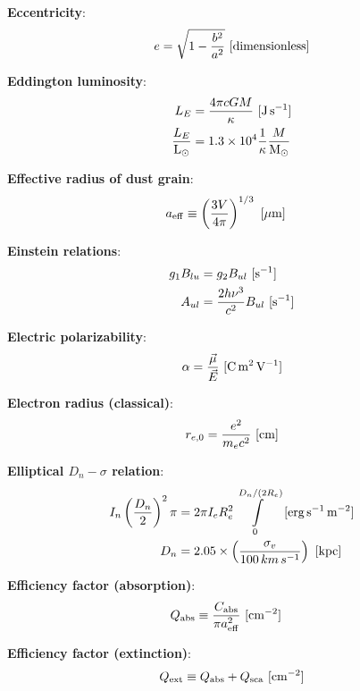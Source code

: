 \documentclass[a4paper,10pt]{article}
\begin{document}
{\noindent}\textbf{Eccentricity}:
\begin{align*}
    e = \sqrt{1-\frac{b^2}{a^2}} ~ [{\rm dimensionless}]
\end{align*}

{\noindent}\textbf{Eddington luminosity}:
\begin{align*}
    L_E &= \frac{4\pi cGM}{\kappa} ~ [{\rm J\,s^{-1}}] \\
    \frac{L_E}{{\rm L_\odot}} &= 1.3\times10^4\frac{1}{\kappa} \frac{M}{{\rm M_\odot}}
\end{align*}

{\noindent}\textbf{Effective radius of dust grain}:
\begin{align*}
    a_{\rm eff} &\equiv \left(\frac{3V}{4\pi}\right)^{1/3}  ~ [{\rm \mu m}]
\end{align*}

{\noindent}\textbf{Einstein relations}:
\begin{align*}
    g_1B_{lu} &= g_2B_{ul} ~ [{\rm s^{-1}}] \\
    A_{ul}    &= \frac{2h\nu^3}{c^2}B_{ul}  ~ [{\rm s^{-1}}]
\end{align*}

{\noindent}\textbf{Electric polarizability}:
\begin{align*}
    \alpha = \frac{\vec{\mu}}{\vec{E}} ~ [{\rm C\,m^2\,V^{-1}}]
\end{align*}

{\noindent}\textbf{Electron radius (classical)}:
\begin{align*}
    r_{e,0} = \frac{e^2}{m_ec^2} ~ [{\rm cm}]
\end{align*}

{\noindent}\textbf{Elliptical $D_n-\sigma$ relation}:
\begin{align*}
    I_n\left(\frac{D_n}{2}\right)^2\pi &= 2\pi I_eR_e^2 \int\limits_0^{D_n/(2R_e)} ~ [{\rm erg\,s^{-1}\,m^{-2}}] \\
    D_n &= 2.05\times\left(\frac{\sigma_v}{100\,km\,s^{-1}}\right) ~ [{\rm kpc}]
\end{align*}

{\noindent}\textbf{Efficiency factor (absorption)}:
\begin{align*}
    Q_{\rm abs} &\equiv \frac{C_{\rm abs}}{\pi a_{\rm eff}^2} ~ [{\rm cm^{-2}}]
\end{align*}

{\noindent}\textbf{Efficiency factor (extinction)}:
\begin{align*}
    Q_{\rm ext} \equiv Q_{\rm abs} + Q_{\rm sca} ~ [{\rm cm^{-2}}]
\end{align*}
\end{document}
